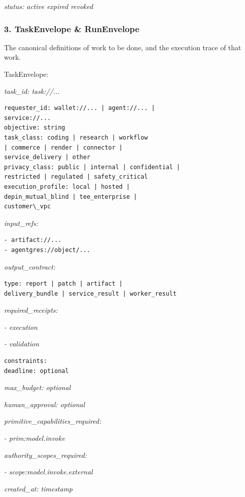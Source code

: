 \documentclass[
  11pt,
]{article}
\begin{document}
\emph{status: active \textbar{} expired \textbar{} revoked}

\hypertarget{taskenvelope-runenvelope}{%
\subsubsection{3. TaskEnvelope \&
RunEnvelope}\label{taskenvelope-runenvelope}}

The canonical definitions of work to be done, and the execution trace of
that work.

TaskEnvelope:

\emph{task\_id: task://...}

\begin{lstlisting}[language={},basicstyle=\ttfamily\scriptsize]
requester_id: wallet://... | agent://... |
service://...
objective: string
task_class: coding | research | workflow
| commerce | render | connector |
service_delivery | other
privacy_class: public | internal | confidential |
restricted | regulated | safety_critical
execution_profile: local | hosted |
depin_mutual_blind | tee_enterprise |
customer\_vpc
\end{lstlisting}

\emph{input\_refs:}

\begin{lstlisting}[language=rustioi]
- artifact://...
- agentgres://object/...
\end{lstlisting}
\emph{output\_contract:}

\begin{lstlisting}[language={},basicstyle=\ttfamily\scriptsize]
type: report | patch | artifact |
delivery_bundle | service_result | worker_result
\end{lstlisting}
\emph{required\_receipts:}

\emph{- execution}

\emph{- validation}

\begin{lstlisting}[language=rustioi]
constraints:
deadline: optional
\end{lstlisting}
\emph{max\_budget: optional}

\emph{human\_approval: optional}

\emph{primitive\_capabilities\_required:}

\emph{- prim:model.invoke}

\emph{authority\_scopes\_required:}

\emph{- scope:model.invoke.external}

\emph{created\_at: timestamp}
\end{document}

